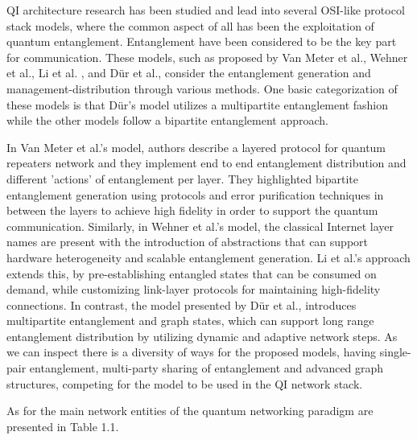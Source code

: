 \documentclass[12pt]{ieeetj}
\begin{document}
		QI architecture research has been studied and lead into several OSI-like protocol 
		stack models, where the common aspect of all has been the exploitation of
		quantum entanglement. Entanglement have been considered to be the key part for communication. 
		These models, such as proposed by Van Meter et al.\cite{quantum-arch}, 
		Wehner et al.\cite{wehner-arch}, Li et al. \cite{li-arch}, and Dür et al.\cite{dur-multipartite}, 
		consider the entanglement generation and management-distribution through various methods.
		One basic categorization of these models is that Dür's model utilizes a multipartite entanglement fashion
		while the other models follow a bipartite entanglement approach.
		
		In Van Meter et al.'s model, authors describe a layered protocol for quantum repeaters network and
		they implement end to end entanglement distribution and different 'actions' of entanglement per layer.
		They highlighted bipartite entanglement generation using protocols and error purification techniques in between the
		layers to achieve  high fidelity in order to support the quantum communication.
		Similarly, in Wehner et al.'s model, the classical Internet layer names are present with the introduction
		of abstractions that can support hardware heterogeneity and scalable entanglement generation. 
		Li et al.'s approach extends this, by pre-establishing entangled states that can be consumed on demand, 
		while customizing link-layer protocols for maintaining high-fidelity connections. 
		In contrast, the model presented by Dür et al., introduces multipartite entanglement and graph states, 
		which can support long range entanglement distribution by utilizing dynamic and adaptive network steps. 
		As we can inspect there is a diversity of ways for the proposed models, having single-pair entanglement, 
		multi-party sharing of entanglement and advanced graph structures, competing for the model to be used
		in the QI network stack.

		As for the main network entities of the quantum networking paradigm\cite{e-qnet} are presented in Table 1.1.
\end{document}
